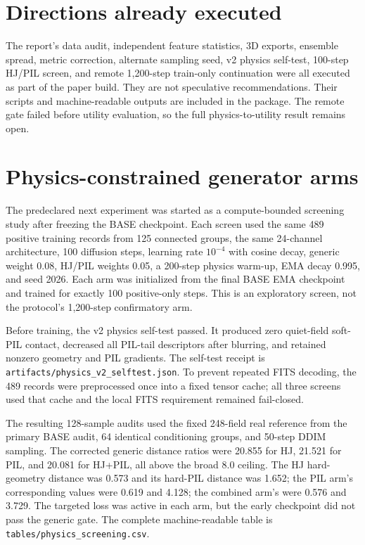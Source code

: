 \documentclass[11pt,oneside]{report}
\begin{document}
\section{Directions already executed}

The report’s data audit, independent feature statistics, 3D exports, ensemble spread, metric correction, alternate sampling seed, v2 physics self-test, 100-step HJ/PIL screen, and remote 1,200-step train-only continuation were all executed as part of the paper build. They are not speculative recommendations. Their scripts and machine-readable outputs are included in the package. The remote gate failed before utility evaluation, so the full physics-to-utility result remains open.

\section{Physics-constrained generator arms}

The predeclared next experiment was started as a compute-bounded screening study after freezing the BASE checkpoint. Each screen used the same 489 positive training records from 125 connected groups, the same 24-channel architecture, 100 diffusion steps, learning rate $10^{-4}$ with cosine decay, generic weight 0.08, HJ/PIL weights 0.05, a 200-step physics warm-up, EMA decay 0.995, and seed 2026. Each arm was initialized from the final BASE EMA checkpoint and trained for exactly 100 positive-only steps. This is an exploratory screen, not the protocol’s 1,200-step confirmatory arm.

Before training, the v2 physics self-test passed. It produced zero quiet-field soft-PIL contact, decreased all PIL-tail descriptors after blurring, and retained nonzero geometry and PIL gradients. The self-test receipt is \texttt{artifacts/physics\_v2\_selftest.json}. To prevent repeated FITS decoding, the 489 records were preprocessed once into a fixed tensor cache; all three screens used that cache and the local FITS requirement remained fail-closed.

The resulting 128-sample audits used the fixed 248-field real reference from the primary BASE audit, 64 identical conditioning groups, and 50-step DDIM sampling. The corrected generic distance ratios were 20.855 for HJ, 21.521 for PIL, and 20.081 for HJ+PIL, all above the broad 8.0 ceiling. The HJ hard-geometry distance was 0.573 and its hard-PIL distance was 1.652; the PIL arm’s corresponding values were 0.619 and 4.128; the combined arm’s were 0.576 and 3.729. The targeted loss was active in each arm, but the early checkpoint did not pass the generic gate. The complete machine-readable table is \texttt{tables/physics\_screening.csv}.
\end{document}
